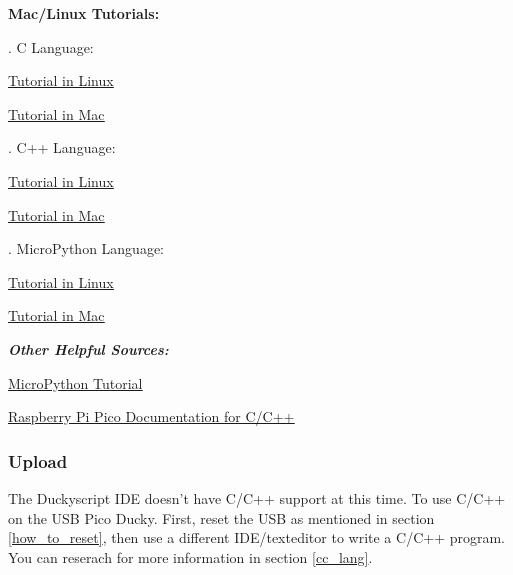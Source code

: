 \documentclass[a4paper,12pt]{article}
\begin{document}
\textbf{Mac/Linux Tutorials:}

\indent{}. C Language:
\begin{description}
	\setlength{\itemindent}{3em}
	\item[$\bullet$] \underline{\href{https://www.electronicshub.org/program-raspberry-pi-pico-using-c/}{Tutorial in Linux}}
	\item[$\bullet$] \underline{\href{https://blog.smittytone.net/2021/02/02/program-raspberry-pi-pico-c-mac/}{Tutorial in Mac}}
\end{description}

\indent{}. C++ Language:
\begin{description}
	\setlength{\itemindent}{3em}
	\item[$\bullet$]\underline{\href{https://circuitdigest.com/microcontroller-projects/how-to-program-raspberry-pi-pico-using-c}{Tutorial in Linux}}
	\item[$\bullet$]\underline{\href{https://www.peterzimon.com/raspberry-pi-pico-mac-c-getting-started/}{Tutorial in Mac}}
\end{description}

\indent{}. MicroPython Language:
\begin{description}
	\setlength{\itemindent}{3em}
	\item[$\bullet$]\underline{\href{https://circuitdigest.com/microcontroller-projects/getting-started-with-raspberry-pi-pico-with-micropython}{Tutorial in Linux}}
	\item[$\bullet$]\underline{\href{https://desertbot.io/blog/raspberry-pi-pico-setup-mac}{Tutorial in Mac}}
\end{description}

\large
\emph{\textbf{Other Helpful Sources:}}
\normalsize
\begin{description}
	\setlength{\itemindent}{3em}
	\item[$\bullet$] \underline{\href{https://how2electronics.com/raspberry-pi-pico-getting-started-tutorial-with-micropython/}{MicroPython Tutorial}}
	\item[$\bullet$] \underline{\href{https://www.raspberrypi.com/documentation/microcontrollers/c_sdk.html}{Raspberry Pi Pico Documentation for C/C++}}
\end{description}

\subsubsection{Upload}

The Duckyscript IDE doesn't have C/C++ support at this time. To use C/C++ on the USB Pico Ducky. First, reset the USB as mentioned in section \ref{how_to_reset}, then use a different IDE/texteditor to write a C/C++ program. You can reserach for more information in section \ref{cc_lang}.


\newpage
\end{document}
